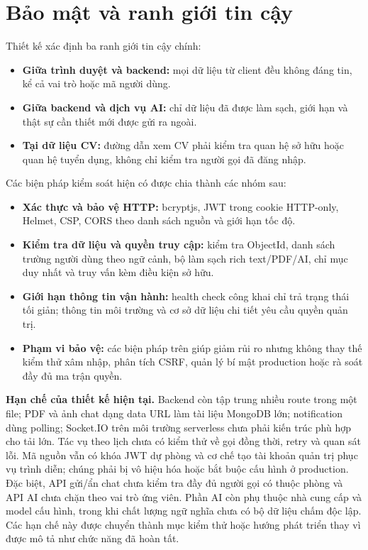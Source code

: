 \section{Bảo mật và ranh giới tin cậy}

Thiết kế xác định ba ranh giới tin cậy chính:

\begin{itemize}
    \item \textbf{Giữa trình duyệt và backend:} mọi dữ liệu từ client đều không đáng tin, kể cả vai trò hoặc mã người dùng.
    \item \textbf{Giữa backend và dịch vụ AI:} chỉ dữ liệu đã được làm sạch, giới hạn và thật sự cần thiết mới được gửi ra ngoài.
    \item \textbf{Tại dữ liệu CV:} đường dẫn xem CV phải kiểm tra quan hệ sở hữu hoặc quan hệ tuyển dụng, không chỉ kiểm tra người gọi đã đăng nhập.
\end{itemize}

Các biện pháp kiểm soát hiện có được chia thành các nhóm sau:

\begin{itemize}
    \item \textbf{Xác thực và bảo vệ HTTP:} bcryptjs, JWT trong cookie HTTP-only, Helmet, CSP, CORS theo danh sách nguồn và giới hạn tốc độ.
    \item \textbf{Kiểm tra dữ liệu và quyền truy cập:} kiểm tra ObjectId, danh sách trường người dùng theo ngữ cảnh, bộ làm sạch rich text/PDF/AI, chỉ mục duy nhất và truy vấn kèm điều kiện sở hữu.
    \item \textbf{Giới hạn thông tin vận hành:} health check công khai chỉ trả trạng thái tối giản; thông tin môi trường và cơ sở dữ liệu chi tiết yêu cầu quyền quản trị.
    \item \textbf{Phạm vi bảo vệ:} các biện pháp trên giúp giảm rủi ro nhưng không thay thế kiểm thử xâm nhập, phân tích CSRF, quản lý bí mật production hoặc rà soát đầy đủ ma trận quyền.
\end{itemize}

\noindent\textbf{Hạn chế của thiết kế hiện tại.}
Backend còn tập trung nhiều route trong một file; PDF và ảnh chat dạng data URL làm tài liệu MongoDB lớn; notification dùng polling; Socket.IO trên môi trường serverless chưa phải kiến trúc phù hợp cho tải lớn. Tác vụ theo lịch chưa có kiểm thử về gọi đồng thời, retry và quan sát lỗi. Mã nguồn vẫn có khóa JWT dự phòng và cơ chế tạo tài khoản quản trị phục vụ trình diễn; chúng phải bị vô hiệu hóa hoặc bắt buộc cấu hình ở production. Đặc biệt, API gửi/ẩn chat chưa kiểm tra đầy đủ người gọi có thuộc phòng và API AI chưa chặn theo vai trò ứng viên. Phần AI còn phụ thuộc nhà cung cấp và model cấu hình, trong khi chất lượng ngữ nghĩa chưa có bộ dữ liệu chấm độc lập. Các hạn chế này được chuyển thành mục kiểm thử hoặc hướng phát triển thay vì được mô tả như chức năng đã hoàn tất.
